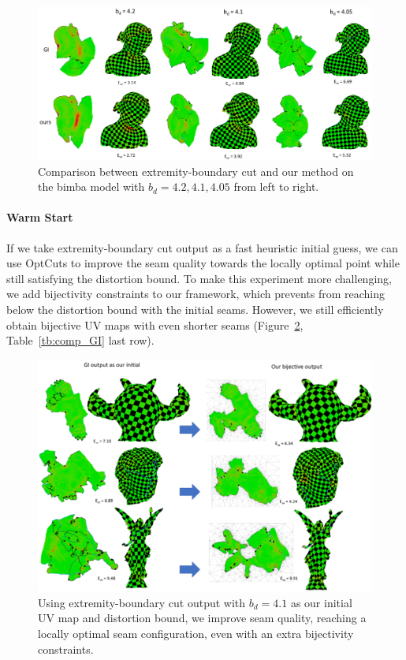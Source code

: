 \begin{figure}[!h]
\centering
\includegraphics[width=\linewidth]{fig/comp_GI.png}
\caption{Comparison between extremity-boundary cut and our method on the bimba model with $b_d = 4.2, 4.1, 4.05$ from left to right.}
\label{fig:comp_GI}
\end{figure}

\paragraph{Warm Start}
If we take extremity-boundary cut output as a fast heuristic initial guess, we can use OptCuts to improve the seam quality towards the locally optimal point while still satisfying the distortion bound. To make this experiment more challenging, we add bijectivity constraints to our framework, which prevents from reaching below the distortion bound with the initial seams. However, we still efficiently obtain bijective UV maps with even shorter seams (Figure~\ref{fig:comp_GI_outputAsInit}, Table~\ref{tb:comp_GI} last row).

\begin{figure}[!h]
\centering
\includegraphics[width=\linewidth]{fig/comp_GI_outputAsInit.png}
\caption{Using extremity-boundary cut output with $b_d = 4.1$ as our initial UV map and distortion bound, we improve seam quality, reaching a locally optimal seam configuration, even with an extra bijectivity constraints.}
\label{fig:comp_GI_outputAsInit}
\end{figure}

